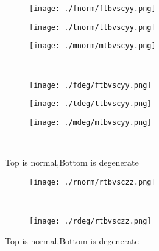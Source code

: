 \documentclass[aps,floats,floatfix,nofootinbib]{revtex4-1}
\begin{document}
\begin{center}
\begin{figure}
\begin{subfigure}{0.3\textwidth}
\texttt{[image: ./fnorm/ftbvscyy.png]}
\label{}
\end{subfigure}
\begin{subfigure}{0.3\textwidth}
\texttt{[image: ./tnorm/ttbvscyy.png]}
\label{}
\end{subfigure}
\begin{subfigure}{0.3\textwidth}
\texttt{[image: ./mnorm/mtbvscyy.png]}
\label{}
\end{subfigure}\\
\begin{subfigure}{0.3\textwidth}
\texttt{[image: ./fdeg/ftbvscyy.png]}
\label{}
\end{subfigure}
\begin{subfigure}{0.3\textwidth}
\texttt{[image: ./tdeg/ttbvscyy.png]}
\label{}
\end{subfigure}
\begin{subfigure}{0.3\textwidth}
\texttt{[image: ./mdeg/mtbvscyy.png]}
\label{}
\end{subfigure}\\
\caption{Top is normal,Bottom is degenerate}
\end{figure}
\end{center}

\begin{center}
\begin{figure}
\begin{subfigure}{0.95\textwidth}
\texttt{[image: ./rnorm/rtbvsczz.png]}
\label{}
\end{subfigure}\\
\begin{subfigure}{0.95\textwidth}
\texttt{[image: ./rdeg/rtbvsczz.png]}
\label{}
\end{subfigure}
\caption{Top is normal,Bottom is degenerate}
\end{figure}
\end{center}
\end{document}
